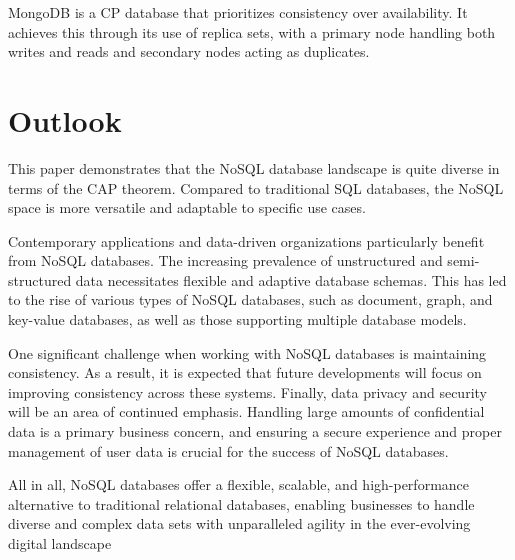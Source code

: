 MongoDB is a CP database that prioritizes consistency over availability. It achieves this through its use of replica sets, with a primary node handling both writes and reads and secondary nodes acting as duplicates. 
\section*{Outlook}
This paper demonstrates that the NoSQL database landscape is quite diverse in terms of the CAP theorem. Compared to traditional SQL databases, the NoSQL space is more versatile and adaptable to specific use cases. 

Contemporary applications and data-driven organizations particularly benefit from NoSQL databases. The increasing prevalence of unstructured and semi-structured data necessitates flexible and adaptive database schemas. This has led to the rise of various types of NoSQL databases, such as document, graph, and key-value databases, as well as those supporting multiple database models.

One significant challenge when working with NoSQL databases is maintaining consistency. As a result, it is expected that future developments will focus on improving consistency across these systems. Finally, data privacy and security will be an area of continued emphasis. Handling large amounts of confidential data is a primary business concern, and ensuring a secure experience and proper management of user data is crucial for the success of NoSQL databases.

All in all, NoSQL databases offer a flexible, scalable, and high-performance alternative to traditional relational databases, enabling businesses to handle diverse and complex data sets with unparalleled agility in the ever-evolving digital landscape
